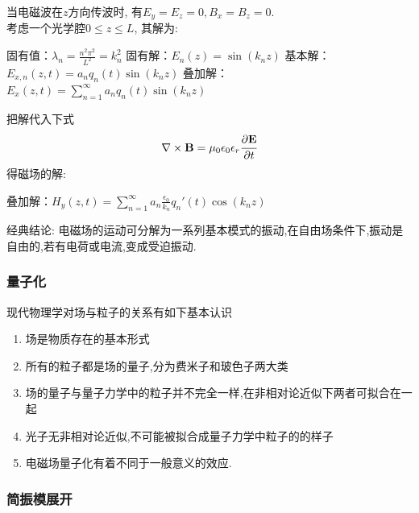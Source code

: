   当电磁波在$z$方向传波时, 有$E_y=E_z=0, B_x=B_z=0$.\\ 
  考虑一个光学腔$0\leq z\leq L$, 其解为:
  \begin{enumerate}
    \IItem 固有值：$\displaystyle  \lambda_n=\frac{n^2\pi^2}{L^2}= k^2 _n $ 
    \IItem 固有解：$\displaystyle  E_n(z)=\sin (k_n z) $
    \IItem 基本解：$\displaystyle E_{x,n}(z,t) = a_n q_n (t) \sin (k_n z) $
    \IItem 叠加解：$\displaystyle E_{x}(z,t) = \sum\limits_{n=1}^{\infty } a_n q_n (t) \sin (k_n z)$
\end{enumerate}	
把解代入下式
\[ \nabla \times \mathbf{B} = \mu_0\epsilon_0 \epsilon_r \cfrac{\partial \mathbf{E}} {\partial t } \]
得磁场的解: 
\begin{enumerate}
  \IItem 叠加解：$\displaystyle H_{y}(z,t) = \sum\limits_{n=1}^{\infty } a_n \frac{\epsilon_0}{k_n}q_n ' (t) \cos (k_n z)$
\end{enumerate}	
经典结论: 电磁场的运动可分解为一系列基本模式的振动,在自由场条件下,振动是自由的,若有电荷或电流,变成受迫振动. \\


\subsubsection{量子化}

{\noindent \Bullet}现代物理学对场与粒子的关系有如下基本认识
\begin{enumerate}
    \item 场是物质存在的基本形式
    \item 所有的粒子都是场的量子,分为费米子和玻色子两大类
    \item 场的量子与量子力学中的粒子并不完全一样,在非相对论近似下两者可拟合在一起
    \item 光子无非相对论近似,不可能被拟合成量子力学中粒子的的样子
    \item 电磁场量子化有着不同于一般意义的效应.
\end{enumerate}

\subsubsection{简振模展开} 

